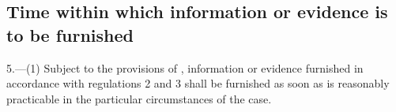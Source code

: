 \documentclass[a4paper,12pt]{article}
\begin{document}
%
%

%

\subsection[5. Time within which information or evidence is to be furnished]{Time within which information or evidence is to be furnished}

5.—(1) Subject to 
the provisions of ,  %
information or evidence furnished in accordance with regulations 2 and 3 shall be furnished as soon as is reasonably practicable in the particular circumstances of the case.
\end{document}
